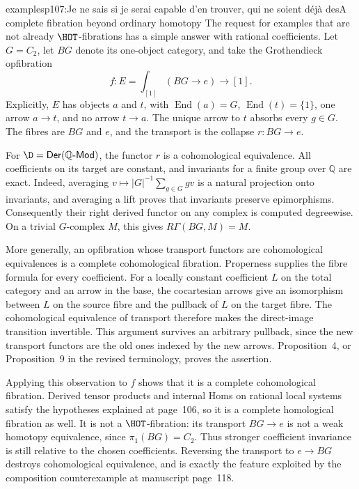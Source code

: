 \begin{dcomment}{examples}{p107:Je ne sais si je serai capable d'en trouver, qui ne soient déjà des}{A complete fibration beyond ordinary homotopy}
The request for examples that are not already $\HOT$-fibrations has a simple answer with rational coefficients. Let $G=C_2$, let $BG$ denote its one-object category, and take the Grothendieck opfibration
\[
 f:E=\int_{[1]}(BG\longrightarrow e)\longrightarrow[1].
\]
Explicitly, $E$ has objects $a$ and $t$, with $\operatorname{End}(a)=G$, $\operatorname{End}(t)=\{1\}$, one arrow $a\to t$, and no arrow $t\to a$. The unique arrow to $t$ absorbs every $g\in G$. The fibres are $BG$ and $e$, and the transport is the collapse $r:BG\to e$.

For $\D=\mathsf{Der}(\mathbb Q\text{-}\mathsf{Mod})$, the functor $r$ is a cohomological equivalence. All coefficients on its target are constant, and invariants for a finite group over $\mathbb Q$ are exact. Indeed, averaging $v\mapsto |G|^{-1}\sum_{g\in G}gv$ is a natural projection onto invariants, and averaging a lift proves that invariants preserve epimorphisms. Consequently their right derived functor on any complex is computed degreewise. On a trivial $G$-complex $M$, this gives $R\Gamma(BG,M)=M$.

More generally, an opfibration whose transport functors are cohomological equivalences is a complete cohomological fibration. Properness supplies the fibre formula for every coefficient. For a locally constant coefficient $L$ on the total category and an arrow in the base, the cocartesian arrows give an isomorphism between $L$ on the source fibre and the pullback of $L$ on the target fibre. The cohomological equivalence of transport therefore makes the direct-image transition invertible. This argument survives an arbitrary pullback, since the new transport functors are the old ones indexed by the new arrows. Proposition~4, or Proposition~9 in the revised terminology, proves the assertion.

Applying this observation to $f$ shows that it is a complete cohomological fibration. Derived tensor products and internal Homs on rational local systems satisfy the hypotheses explained at page~106, so it is a complete homological fibration as well. It is not a $\HOT$-fibration: its transport $BG\to e$ is not a weak homotopy equivalence, since $\pi_1(BG)=C_2$. Thus stronger coefficient invariance is still relative to the chosen coefficients. Reversing the transport to $e\to BG$ destroys cohomological equivalence, and is exactly the feature exploited by the composition counterexample at manuscript page~118.
\end{dcomment}

